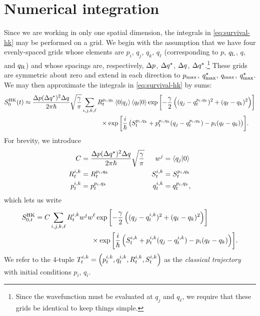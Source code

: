 \section{Numerical integration}

Since we are working in only one spatial dimension, the integrals in \cref{eq:survival-hk} may be performed on a grid.
We begin with the assumption that we have four evenly-spaced grids whose elements are $p_i$, $q_j$, $q_k$, $q_\ell$ (corresponding to $p$, $q_\mathrm{L}$, $q$, and $q_\mathrm{R}$) and whose spacings are, respectively, $\Delta p$, $\Delta q^\star$, $\Delta q$, $\Delta q^\star$.\footnote{
	Since the wavefunction must be evaluated at $q_j$ and $q_\ell$, we require that these grids be identical to keep things simple.
}
These grids are symmetric about zero and extend in each direction to $p_\mathrm{max}$, $q_\mathrm{max}^\star$, $q_\mathrm{max}$, $q_\mathrm{max}^\star$.
We may then approximate the integrals in \cref{eq:survival-hk} by sums:
\begin{align}
	S_0^\mathrm{HK}(t)
	&\approx \frac{\Delta p (\Delta q^\star)^2 \Delta q}{2 \pi \hbar} \sqrt{\frac{\gamma}{\pi}} \sum_{i,j,k,\ell}
			R^{p_i,q_k}_t \braket{0 | q_j} \braket{q_\ell | 0}
			\exp{\left[ -\frac{\gamma}{2} \left( (q_j - q^{p_i,q_k}_t)^2 + (q_\ell - q_k)^2 \right) \right]} \notag \\
	&\qquad\qquad\qquad\qquad\qquad\qquad\times
			\exp{\left[ \frac{i}{\hbar} \left( S^{p_i,q_k}_t + p^{p_i,q_k}_t (q_j - q^{p_i,q_k}_t) - p_i (q_\ell - q_k) \right) \right]}.
\end{align}
For brevity, we introduce
\begin{subequations}
\begin{align}
	C
	&= \frac{\Delta p (\Delta q^\star)^2 \Delta q}{2 \pi \hbar} \sqrt{\frac{\gamma}{\pi}}
	&
	w^j
	&= \braket{q_j | 0} \\
	R^{i,k}_t
	&= R^{p_i,q_k}_t
	&
	S^{i,k}_t
	&= S^{p_i,q_k}_t \\
	p^{i,k}_t
	&= p^{p_i,q_k}_t
	&
	q^{i,k}_t
	&= q^{p_i,q_k}_t,
\end{align}
\end{subequations}
which lets us write
\begin{align}
	S_{0,t}^\mathrm{HK}
	&= C \sum_{i,j,k,\ell}
			R^{i,k}_t w^j w^\ell
			\exp{\left[ -\frac{\gamma}{2} \left( (q_j - q^{i,k}_t)^2 + (q_\ell - q_k)^2 \right) \right]} \notag \\
	&\qquad\qquad\qquad\qquad\times
			\exp{\left[ \frac{i}{\hbar} \left( S^{i,k}_t + p^{i,k}_t (q_j - q^{i,k}_t) - p_i (q_\ell - q_k) \right) \right]}.
				\label{eq:survival-hk-num}
\end{align}
We refer to the 4-tuple $T^{i,k}_t = \left( p^{i,k}_t, q^{i,k}_t, R^{i,k}_t, S^{i,k}_t \right)$ as the \emph{classical trajectory} with initial conditions $p_i$, $q_i$.

